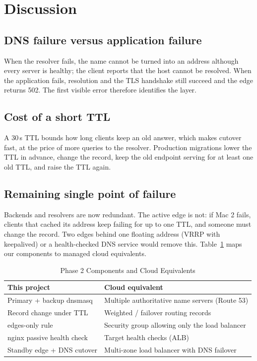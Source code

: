 \documentclass[conference]{IEEEtran}
\newcommand{\code}[1]{\texttt{\detokenize{#1}}}
\begin{document}
\section{Discussion}\label{sec:discussion}

\subsection{DNS failure versus application failure}
When the resolver fails, the name cannot be turned into an address
although every server is healthy; the client reports that the host cannot
be resolved. When the application fails, resolution and the TLS handshake
still succeed and the edge returns 502. The first visible error therefore
identifies the layer.

\subsection{Cost of a short TTL}
A 30\,s TTL bounds how long clients keep an old answer, which makes
cutover fast, at the price of more queries to the resolver. Production
migrations lower the TTL in advance, change the record, keep the old
endpoint serving for at least one old TTL, and raise the TTL again.

\subsection{Remaining single point of failure}
Backends and resolvers are now redundant. The active edge is not: if Mac 2
fails, clients that cached its address keep failing for up to one TTL,
and someone must change the record. Two edges behind one floating address
(VRRP with keepalived) or a health-checked DNS service would remove this.
Table~\ref{tab:cloud} maps our components to managed cloud equivalents.

\begin{table}[t]
\caption{Phase 2 Components and Cloud Equivalents}\label{tab:cloud}
\centering\footnotesize
\begin{tabular}{@{}p{3.3cm} p{4.4cm}@{}}
\toprule
This project & Cloud equivalent\\
\midrule
Primary + backup dnsmasq & Multiple authoritative name servers (Route 53)\\
Record change under TTL & Weighted / failover routing records\\
\code{pf} edges-only rule & Security group allowing only the load balancer\\
nginx passive health check & Target health checks (ALB)\\
Standby edge + DNS cutover & Multi-zone load balancer with DNS failover\\
\bottomrule
\end{tabular}
\end{table}
\end{document}
